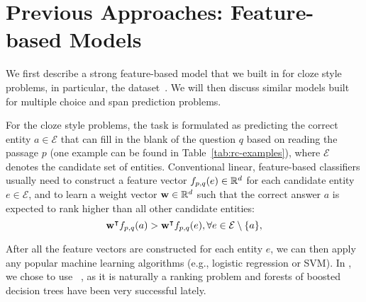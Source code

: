 
\section{Previous Approaches: Feature-based Models}
\label{sec:feature-models}


We first describe a strong feature-based model that we built in  for cloze style problems, in particular, the  dataset~\cite{hermann2015teaching}. We will then discuss similar models built for multiple choice and span prediction problems.

For the cloze style problems, the task is formulated as predicting the correct entity $a \in \mathcal{E}$ that can fill in the blank of the question $q$ based on reading the passage $p$ (one example can be found in Table~\ref{tab:rc-examples}), where $\mathcal{E}$ denotes the candidate set of entities. Conventional linear, feature-based classifiers usually need to construct a feature vector $f_{{p}, {q}}(e) \in \mathbb{R}^d$ for each candidate entity $e \in \mathcal{E}$, and to learn a weight vector $\mathbf{w} \in \mathbb{R}^d$ such that the correct answer $a$ is expected to rank higher than all other candidate entities:
\begin{equation}
\mathbf{w}^{\intercal}f_{p, q}(a) > \mathbf{w}^{\intercal}f_{{p}, {q}}(e), \forall e \in \mathcal{E} \setminus \{{a}\},
\end{equation}

After all the feature vectors are constructed for each entity $e$, we can then apply any popular machine learning algorithms (e.g., logistic regression or SVM). In , we chose to use ~\cite{wu2010adapting}, as it is naturally a ranking problem and forests of boosted decision trees have been very successful lately.

